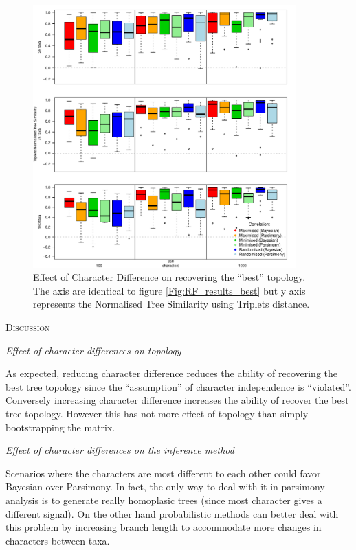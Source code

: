 \documentclass[12pt,letterpaper]{article}
\renewcommand{\section}[1]{%
\bigskip
\begin{center}
\begin{Large}
\normalfont\scshape #1
\medskip
\end{Large}
\end{center}}
\renewcommand{\subsection}[1]{%
\bigskip
\begin{center}
\begin{large}
\normalfont\itshape #1
\end{large}
\end{center}}
\begin{document}
\begin{figure}[!htbp]
\centering
   \includegraphics[width=0.9\textwidth]{Figures/Tr_results_best.pdf} %
\caption{Effect of Character Difference on recovering the ``best'' topology. The axis are identical to figure \ref{Fig:RF_results_best} but y axis represents the Normalised Tree Similarity using Triplets distance.}
\label{Fig:Tr_results_best}
\end{figure}




\section{Discussion}

\subsection{Effect of character differences on topology}
As expected, reducing character difference reduces the ability of recovering the best tree topology since the ``assumption'' of character independence is ``violated''.
Conversely increasing character difference increases the ability of recover the best tree topology.
However this has not more effect of topology than simply bootstrapping the matrix.

\subsection{Effect of character differences on the inference method}
Scenarios where the characters are most different to each other could favor Bayesian over Parsimony.
In fact, the only way to deal with it in parsimony analysis is to generate really homoplasic trees (since most character gives a different signal).
On the other hand probabilistic methods can better deal with this problem by increasing branch length to accommodate more changes in characters between taxa.
\end{document}
